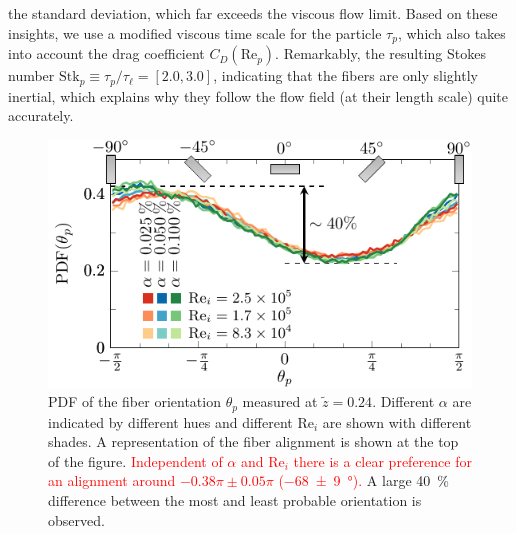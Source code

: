 \documentclass[aps, pre, onecolumn, superscriptaddress,longbibliography]{revtex4-1}
\newcommand{\makered}[1]{\textcolor{red}{#1}}
\begin{document}
the standard deviation, which far exceeds the viscous flow limit. Based on
these insights, we use a modified viscous time scale
\cite{Clift1978,Qureshi2007} for the particle $\tau_p$, which also takes into
account the drag coefficient $C_D(\text{Re}_p)$. Remarkably, the resulting
Stokes number $\text{Stk}_p \equiv \tau_p/\tau_\ell = [2.0, 3.0]$, indicating that
the fibers are only slightly inertial, which explains why they follow the flow
field (at their length scale) quite accurately.\\%
%
\begin{figure}[htp]
\centering
\includegraphics[scale=1.2]{figure4aorientationRe}
\caption{PDF of the fiber orientation $\theta_p$ measured at $\tilde{z} =
0.24$. Different $\alpha$ are indicated by different hues and different
$\text{Re}_i$ are shown with different shades. A representation of the fiber
alignment is shown at the top of the figure. \makered{Independent of $\alpha$ and
$\text{Re}_i$ there is a clear preference for an alignment around
$-0.38\pi \pm 0.05\pi$ (\SI[separate-uncertainty =
true,multi-part-units=single]{-68(9)}{\degree}).} A large \SI{40}{\percent} difference between the most and
least probable orientation is observed.}
\label{fig:orientre}
\end{figure}
%
\end{document}
